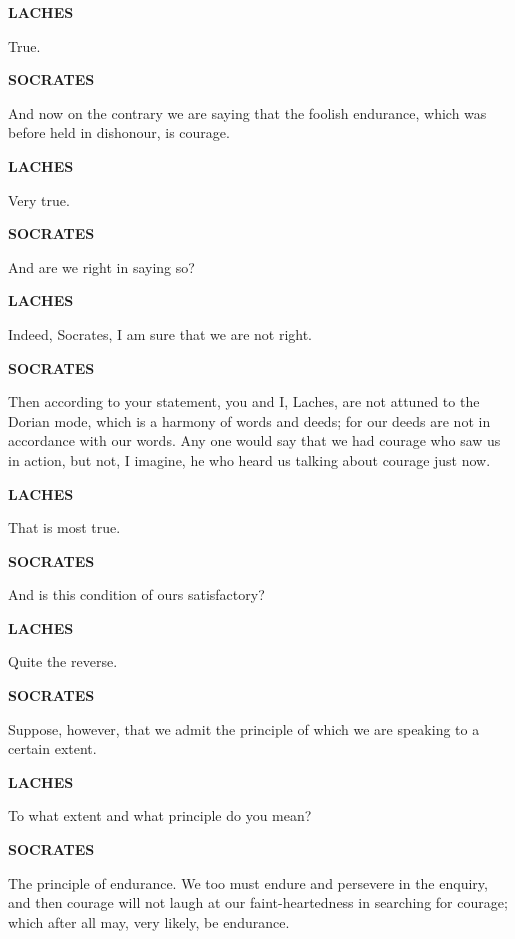 \documentclass[11pt,letter]{article}
\begin{document}
\par \textbf{LACHES}
\par   True.

\par \textbf{SOCRATES}
\par   And now on the contrary we are saying that the foolish endurance, which was before held in dishonour, is courage.

\par \textbf{LACHES}
\par   Very true.

\par \textbf{SOCRATES}
\par   And are we right in saying so?

\par \textbf{LACHES}
\par   Indeed, Socrates, I am sure that we are not right.

\par \textbf{SOCRATES}
\par   Then according to your statement, you and I, Laches, are not attuned to the Dorian mode, which is a harmony of words and deeds; for our deeds are not in accordance with our words. Any one would say that we had courage who saw us in action, but not, I imagine, he who heard us talking about courage just now.

\par \textbf{LACHES}
\par   That is most true.

\par \textbf{SOCRATES}
\par   And is this condition of ours satisfactory?

\par \textbf{LACHES}
\par   Quite the reverse.

\par \textbf{SOCRATES}
\par   Suppose, however, that we admit the principle of which we are speaking to a certain extent.

\par \textbf{LACHES}
\par   To what extent and what principle do you mean?

\par \textbf{SOCRATES}
\par   The principle of endurance. We too must endure and persevere in the enquiry, and then courage will not laugh at our faint-heartedness in searching for courage; which after all may, very likely, be endurance.
\end{document}
